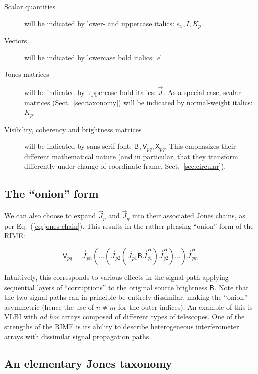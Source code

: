 \documentclass[referee]{aa}
\newcommand{\herm}{H}
\newcommand{\jones}[2]{\vec {#1}_{#2}}
\newcommand{\jonesT}[2]{\vec {#1}^{\herm}_{#2}}
\newcommand{\coh}[2]{\mathsf{{#1}}_{{#2}}}
\begin{document}
\begin{description}
\item[Scalar quantities] will be indicated by lower- and uppercase italics: $e_x,I,K_p$.
\item[Vectors] will be indicated by lowercase bold italics: $\vec e$.
\item[Jones matrices] will be indicated by uppercase bold italics: $\jones{J}{}$. As a special case, scalar matrices
(Sect.~\ref{sec:taxonomy}) will be indicated by normal-weight italics: $K_p$.
\item[Visibility, coherency and brightness matrices] will be indicated by sans-serif font: 
$\coh{B}{}, \coh{V}{pq}, \coh{X}{pq}$. This emphasizes their different mathematical nature (and in particular, that they transform differently under change of coordinate frame, Sect.~\ref{sec:circular}).
\end{description}

\subsection{The ``onion'' form}

We can also choose to expand $\jones{J}{p}$ and $\jones{J}{q}$ into their associated Jones chains, as per 
Eq.~(\ref{eq:jones-chain}). This results in the rather pleasing ``onion'' form of the RIME:

    \begin{equation}\label{eq:me0-onion}
    \coh{V}{pq} = \jones{J}{pn}(...(\jones{J}{p2} (\jones{J}{p1} \coh{B}{}  \jones{J}{q1}^\herm)\jonesT{J}{q2}) ... )\jonesT{J}{qm}
    \end{equation}

Intuitively, this corresponds to various effects in the signal path applying sequential layers of ``corruptions'' to the original source brightness $\coh{B}{}$. Note that the two signal paths can in principle be entirely dissimilar, making the ``onion'' asymmetric (hence the use of $n\ne m$ for the outer indices). An example of this is VLBI with \emph{ad hoc} arrays composed of different types of telescopes. One of the strengths of the RIME is its ability to describe heterogeneous interferometer arrays with dissimilar signal propagation paths.

\subsection{An elementary Jones taxonomy\label{sec:taxonomy}}
\end{document}
